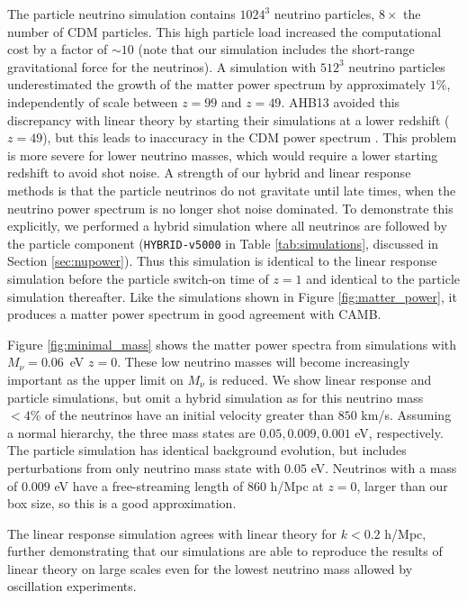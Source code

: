 \documentclass[useAMS, usenatbib]{mnras}
\begin{document}
The particle neutrino simulation contains $1024^3$ neutrino particles, $8\times$ the number of CDM particles. This high particle load increased the computational cost by a factor of $\sim 10$ (note that our simulation includes the short-range gravitational force for the neutrinos). A simulation with $512^3$ neutrino particles underestimated the growth of the matter power spectrum by approximately $1\%$, independently of scale between $z=99$ and $z=49$. AHB13 avoided this discrepancy with linear theory by starting their simulations at a lower redshift ($z=49$), but this leads to inaccuracy in the CDM power spectrum \citep{Heitmann:2010}. This problem is more severe for lower neutrino masses, which would require a lower starting redshift to avoid shot noise. A strength of our hybrid and linear response methods is that the particle neutrinos do not gravitate until late times, when the neutrino power spectrum is no longer shot noise dominated. To demonstrate this explicitly, we performed a hybrid simulation where all neutrinos are followed by the particle component (\texttt{HYBRID-v5000} in Table \ref{tab:simulations}, discussed in Section \ref{sec:nupower}). Thus this simulation is identical to the linear response simulation before the particle switch-on time of $z=1$ and identical to the particle simulation thereafter. Like the simulations shown in Figure \ref{fig:matter_power}, it produces a matter power spectrum in good agreement with CAMB.

Figure \ref{fig:minimal_mass} shows the matter power spectra from simulations with $M_\nu = 0.06$~eV $z=0$. These low neutrino masses will become increasingly important as the upper limit on $M_\nu$ is reduced. We show linear response and particle simulations, but omit a hybrid simulation as for this neutrino mass $ < 4\%$ of the neutrinos have an initial velocity greater than $850$ km/s. Assuming a normal hierarchy, the three mass states are $0.05, 0.009, 0.001$ eV, respectively. The particle simulation has identical background evolution, but includes perturbations from only neutrino mass state with $0.05$ eV. Neutrinos with a mass of $0.009$ eV have a free-streaming length of $860$ h/Mpc at $z=0$, larger than our box size, so this is a good approximation.

The linear response simulation agrees with linear theory for $k < 0.2$ h/Mpc, further demonstrating that our simulations are able to reproduce the results of linear theory on large scales even for the lowest neutrino mass allowed by oscillation experiments.
\end{document}
